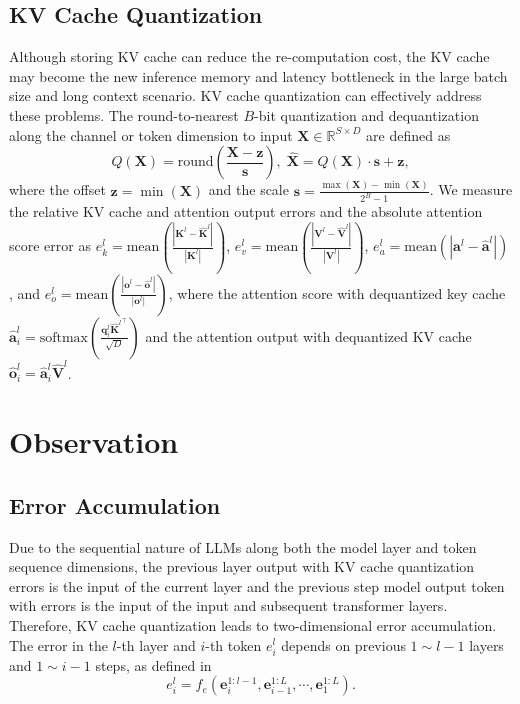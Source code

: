 \subsection{KV Cache Quantization}
\label{sec:kvcache_quantization_errors}
Although storing KV cache can reduce the re-computation cost, the KV cache may become the new inference memory and latency bottleneck in the large batch size and long context scenario. 
KV cache quantization can effectively address these problems.
The round-to-nearest $B$-bit quantization and dequantization along the channel or token dimension to input $\boldsymbol{X} \in \mathbb{R}^{S \times D}$ are defined as
\begin{equation}
Q(\boldsymbol{X}) = \mbox{round}\left(\frac{\boldsymbol{X} - \boldsymbol{z}}{\boldsymbol{s}}\right), \; \hat{\boldsymbol{X}} = Q(\boldsymbol{X}) \cdot \boldsymbol{s} + \boldsymbol{z},
\end{equation}
where the offset $\boldsymbol{z} = \min(\boldsymbol{X})$ and the scale $\boldsymbol{s} = \frac{\max(\boldsymbol{X}) - \min(\boldsymbol{X})}{2^B - 1}$. We measure the relative KV cache and attention output errors and the absolute attention score error as 
$e_k^l = \text{mean}\left(\frac{|\boldsymbol{K}^l - \hat{\boldsymbol{K}}^l|}{|\boldsymbol{K}^l|}\right)$,
$e_v^l = \text{mean}\left(\frac{|\boldsymbol{V}^l - \hat{\boldsymbol{V}}^l|}{|\boldsymbol{V}^l|}\right)$,
$e_a^l = \text{mean}(|\boldsymbol{a}^l - \hat{\boldsymbol{a}}^l|)$, and
$e_o^l = \text{mean}\left(\frac{|\boldsymbol{o}^l - \hat{\boldsymbol{o}}^l|}{|\boldsymbol{o}^l|}\right)$, 
where the attention score with dequantized key cache $\hat{\boldsymbol{a}}_i^l = \text{softmax}\left(\frac{\boldsymbol{q}_i^l {\boldsymbol{\hat{K}}^l}^\top}{\sqrt{D}}\right)$ and the attention output with dequantized KV cache $\hat{\boldsymbol{o}}_i^l =  \hat{\boldsymbol{a}}_i^l \hat{\boldsymbol{V}}^l$.


\section{Observation}
\subsection{Error Accumulation}
\label{sec:error_accumulation}
Due to the sequential nature of LLMs along both the model layer and token sequence dimensions, the previous layer output with KV cache quantization errors is the input of the current layer and the previous step model output token with errors is the input of the input and subsequent transformer layers. Therefore, KV cache quantization leads to two-dimensional error accumulation. The error in the $l$-th layer and $i$-th token $e_{i}^{l}$ depends on previous $1\sim l-1$ layers and $1\sim i-1$ steps, as defined in
\begin{equation}
e_i^l= f_e(\boldsymbol{e}_{i}^{1:l-1}, \boldsymbol{e}_{i-1}^{1:L}, \cdots, \boldsymbol{e}_{1}^{1:L}).
\end{equation}

